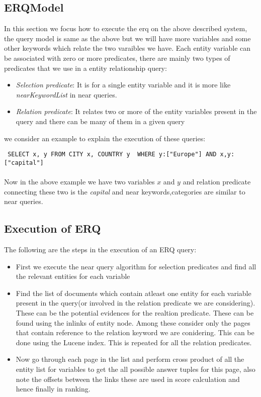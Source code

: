 \documentclass[a4paper,12pt]{report}
\begin{document}
\subsection{ERQModel}
In this section we focus how to execute the erq on the above described system, the query model is same as the above but we will have more variables and some other keywords which relate the two varaibles we have. Each entity variable can be associated with zero or more predicates, there are mainly two types of predicates that we use in a entity relationship query:
\begin{itemize}
  \item\textit{Selection predicate}: It is for a single entity variable and it is more like \textit{nearKeywordList} in near queries.
  \item\textit{Relation predicate}: It relates two or more of the entity variables present in the query and there can be many of them in a given query
\end{itemize}
we consider an example to explain the execution of these queries:
 \begin{verbatim} SELECT x, y FROM CITY x, COUNTRY y  WHERE y:["Europe"] AND x,y:["capital"] \end{verbatim}
\paragraph*{}
Now in the above example we have two variables $x$ and $y$ and relation predicate connecting these two is the \textit{capital} and near keywords,categories are similar to near queries.
\subsection{Execution of ERQ}
The following are the steps in the execution of an ERQ query:
\begin{itemize}
\item First we execute the near query algorithm for selection predicates and find all the relevant entities for each variable
\item Find the list of documents which contain atleast one entity for each variable present in the query(or involved in the relation predicate we are considering). These can be the potential evidences for the realtion predicate. These can be found using the inlinks of entity node. Among these consider only the pages that contain reference to the relation keyword we are conidering. This can be done using the Lucene index. This is repeated for all the relation predicates.
\item Now go through each page in the list and perform cross product of all the entity list for variables to get the all possible answer tuples for this page, also note the offsets between the links these are used in score calculation and hence finally in ranking.
\end{itemize}
\end{document}
